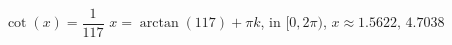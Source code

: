 {$\cot(x) = \dfrac{1}{117}$}
{ $x = \arctan(117) + \pi k$, in  $[0, 2\pi)$, $x \approx 1.5622, \, 4.7038$}

